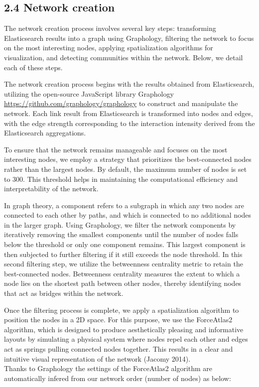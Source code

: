 \documentclass[
]{article}
\begin{document}
\hypertarget{network-creation}{%
\subsection{2.4 Network creation}\label{network-creation}}

The network creation process involves several key steps: transforming
Elasticsearch results into a graph using Graphology, filtering the
network to focus on the most interesting nodes, applying spatialization
algorithms for visualization, and detecting communities within the
network. Below, we detail each of these steps.

The network creation process begins with the results obtained from
Elasticsearch, utilizing the open-source JavaScript library Graphology
\url{https://github.com/graphology/graphology} to construct and
manipulate the network. Each link result from Elasticsearch is
transformed into nodes and edges, with the edge strength corresponding
to the interaction intensity derived from the Elasticsearch
aggregations.

To ensure that the network remains manageable and focuses on the most
interesting nodes, we employ a strategy that prioritizes the
best-connected nodes rather than the largest nodes. By default, the
maximum number of nodes is set to 300. This threshold helps in
maintaining the computational efficiency and interpretability of the
network.

In graph theory, a component refers to a subgraph in which any two nodes
are connected to each other by paths, and which is connected to no
additional nodes in the larger graph. Using Graphology, we filter the
network components by iteratively removing the smallest components until
the number of nodes falls below the threshold or only one component
remains. This largest component is then subjected to further filtering
if it still exceeds the node threshold. In this second filtering step,
we utilize the betweenness centrality metric to retain the
best-connected nodes. Betweenness centrality measures the extent to
which a node lies on the shortest path between other nodes, thereby
identifying nodes that act as bridges within the network.

Once the filtering process is complete, we apply a spatialization
algorithm to position the nodes in a 2D space. For this purpose, we use
the ForceAtlas2 algorithm, which is designed to produce aesthetically
pleasing and informative layouts by simulating a physical system where
nodes repel each other and edges act as springs pulling connected nodes
together. This results in a clear and intuitive visual representation of
the network (Jacomy 2014).\\
Thanks to Graphology the settings of the ForceAtlas2 algorithm are
automatically infered from our network order (number of nodes) as below:
\end{document}
